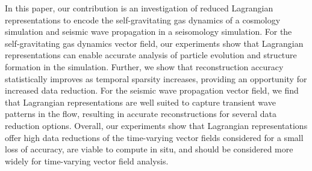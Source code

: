 %
%
%
%
%

In this paper, our contribution is an investigation of reduced Lagrangian representations to encode the self-gravitating gas dynamics of a cosmology simulation and seismic wave propagation in a seisomology simulation.
%
For the self-gravitating gas dynamics vector field, our experiments show that Lagrangian representations can enable accurate analysis of particle evolution and structure formation in the simulation.
%
Further, we show that reconstruction accuracy statistically improves as temporal sparsity increases, providing an opportunity for increased data reduction.
%
For the seismic wave propagation vector field, we find that Lagrangian representations are well suited to capture transient wave patterns in the flow, resulting in accurate reconstructions for several data reduction options.
%
Overall, our experiments show that Lagrangian representations offer high data reductions of the time-varying vector fields considered for a small loss of accuracy, are viable to compute in situ, and should be considered more widely for time-varying vector field analysis.  
%
%
%
%
%
%
%

